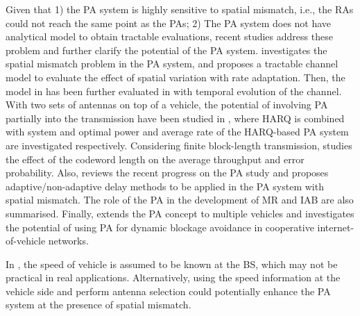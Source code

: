 \documentclass[conference]{IEEEtran}
\begin{document}
Given that 1) the \ac{PA} system is highly sensitive to spatial mismatch, i.e., the \acp{RA} could not reach the same point as the \acp{PA}; 2) The \ac{PA} system does not have analytical model to obtain tractable evaluations, recent studies \cite{Guo2019WCLrate,guo2020semilinear,guo2020power,Guo2020rate,guo2020comnet,guo2021predictor,guo2021mag2} address these problem and further clarify the potential of the \ac{PA} system. \cite{Guo2019WCLrate} investigates the spatial mismatch problem in the \ac{PA} system, and proposes a tractable channel model to evaluate the effect of spatial variation with rate adaptation. Then, the model in \cite{Guo2019WCLrate} has been further evaluated in \cite{guo2020semilinear} with temporal evolution of the channel. With two sets of antennas on  top of a vehicle, the potential of involving \ac{PA} partially into the transmission have been studied in \cite{guo2020power,Guo2020rate}, where \ac{HARQ} is combined with system and optimal power \cite{guo2020power} and average rate \cite{Guo2020rate} of the \ac{HARQ}-based \ac{PA} system are investigated respectively. Considering finite block-length transmission, \cite{guo2020comnet} studies the effect of the codeword length on the average throughput and error probability. Also, \cite{guo2021predictor} reviews the recent progress on the \ac{PA} study and proposes adaptive/non-adaptive delay methods to be applied in the \ac{PA} system with spatial mismatch. The role of the \ac{PA} in the development of \ac{MR} and \ac{IAB} are also summarised. Finally, \cite{guo2021mag2} extends the \ac{PA} concept to multiple vehicles and investigates the potential of using \ac{PA} for dynamic blockage avoidance in cooperative internet-of-vehicle networks.

In \cite{Guo2019WCLrate,guo2020semilinear,guo2020power,Guo2020rate,guo2020comnet,guo2021predictor,guo2021mag2}, the speed of vehicle is assumed to be known at the \ac{BS}, which may not be practical in real applications. Alternatively, using the speed information at the vehicle side and perform antenna selection could potentially enhance the \ac{PA} system at the presence of spatial mismatch.
\end{document}
